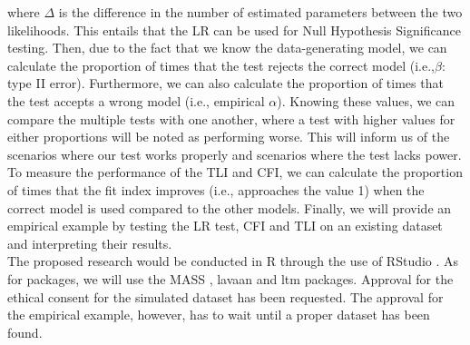 \documentclass{article}
\begin{document}
where $\Delta$ is the difference in the number of estimated parameters between the two likelihoods. This entails that the LR can be used for Null Hypothesis Significance testing. Then, due to the fact that we know the data-generating model, we can calculate the proportion of times that the test rejects the correct model (i.e.,$\beta$: type II error). Furthermore, we can also calculate the proportion of times that the test accepts a wrong model (i.e., empirical $\alpha$). Knowing these values, we can compare the multiple tests with one another, where a test with higher values for either proportions will be noted as performing worse. This will inform us of the scenarios where our test works properly and scenarios where the test lacks power. 
To measure the performance of the TLI and CFI, we can calculate the proportion of times that the fit index improves (i.e., approaches the value 1) when the correct model is used compared to the other models. Finally, we will provide an empirical example by testing the LR test, CFI and TLI on an existing dataset and interpreting their results. \\
\indent The proposed research would be conducted in R \autocite{R} through the use of RStudio \autocite{Rstudio}. As for packages, we will use the MASS \autocite{mass}, lavaan \autocite{lavaan} and ltm \autocite{ltmpack} packages. Approval for the ethical consent for the simulated dataset has been requested. The approval for the empirical example, however, has to wait until a proper dataset has been found.


\nocite{*}

\newpage
\printbibliography
\end{document}
